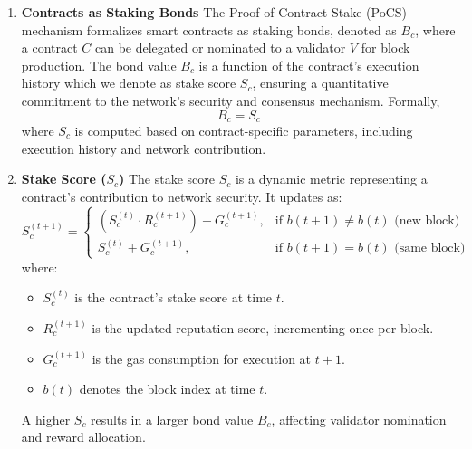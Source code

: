 \documentclass{article}
\begin{document}
\begin{enumerate}
    \item \textbf{Contracts as Staking Bonds} The Proof of Contract Stake (PoCS) mechanism formalizes smart contracts as staking bonds, denoted as $B_c$, where a contract $C$ can be delegated or nominated to a validator $V$ for block production. The bond value $B_c$ is a function of the contract’s execution history which we denote as stake score $S_c$, ensuring a quantitative commitment to the network’s security and consensus mechanism. Formally, 
    \begin{equation}
        B_c = S_c
    \end{equation}
    where $S_c$ is computed based on contract-specific parameters, including execution history and network contribution.
    
    \item \textbf{Stake Score ($S_c$)} The stake score $S_c$ is a dynamic metric representing a contract’s contribution to network security. It updates as:  
    \begin{equation}
        S_c^{(t+1)} =
        \begin{cases} 
        (S_c^{(t)} \cdot R_c^{(t+1)}) + G_c^{(t+1)}, & \text{if } b(t+1) \neq b(t) \text{ (new block)} \\
        S_c^{(t)} + G_c^{(t+1)}, & \text{if } b(t+1) = b(t) \text{ (same block)}
        \end{cases}
    \end{equation}
    where:
    \begin{itemize}
        \item $S_c^{(t)}$ is the contract’s stake score at time $t$.
        \item $R_c^{(t+1)}$ is the updated reputation score, incrementing once per block.
        \item $G_c^{(t+1)}$ is the gas consumption for execution at $t+1$.
        \item $b(t)$ denotes the block index at time $t$.
    \end{itemize}
    A higher $S_c$ results in a larger bond value $B_c$, affecting validator nomination and reward allocation.


\end{enumerate}
\end{document}
